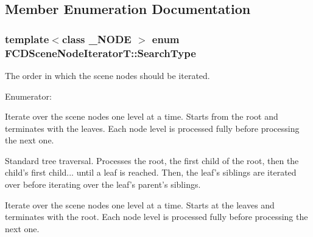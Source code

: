 \subsection{Member Enumeration Documentation}
\hypertarget{classFCDSceneNodeIteratorT_aa4caf69a5959db0fa82e3d25e8b56367}{
\subsubsection[{SearchType}]{\setlength{\rightskip}{0pt plus 5cm}template$<$class \_\-NODE $>$ enum {\bf FCDSceneNodeIteratorT::SearchType}}}
\label{classFCDSceneNodeIteratorT_aa4caf69a5959db0fa82e3d25e8b56367}
The order in which the scene nodes should be iterated. \begin{Desc}
\item[Enumerator: ]\par
\begin{description}
\item[{\em 
\hypertarget{classFCDSceneNodeIteratorT_aa4caf69a5959db0fa82e3d25e8b56367a4a40ecf50eeb28d5adf02fc8f55550be}{
BREADTH\_\-FIRST}
\label{classFCDSceneNodeIteratorT_aa4caf69a5959db0fa82e3d25e8b56367a4a40ecf50eeb28d5adf02fc8f55550be}
}]Iterate over the scene nodes one level at a time. Starts from the root and terminates with the leaves. Each node level is processed fully before processing the next one. \item[{\em 
\hypertarget{classFCDSceneNodeIteratorT_aa4caf69a5959db0fa82e3d25e8b56367a5ad049a76b27b906ce1389609106229c}{
DEPTH\_\-FIRST\_\-PREORDER}
\label{classFCDSceneNodeIteratorT_aa4caf69a5959db0fa82e3d25e8b56367a5ad049a76b27b906ce1389609106229c}
}]Standard tree traversal. Processes the root, the first child of the root, then the child's first child... until a leaf is reached. Then, the leaf's siblings are iterated over before iterating over the leaf's parent's siblings. \item[{\em 
\hypertarget{classFCDSceneNodeIteratorT_aa4caf69a5959db0fa82e3d25e8b56367af674b6b62e2e3a67ca888a94b058aeff}{
DEPTH\_\-FIRST\_\-POSTORDER}
\label{classFCDSceneNodeIteratorT_aa4caf69a5959db0fa82e3d25e8b56367af674b6b62e2e3a67ca888a94b058aeff}
}]Iterate over the scene nodes one level at a time. Starts at the leaves and terminates with the root. Each node level is processed fully before processing the next one. \end{description}
\end{Desc}



